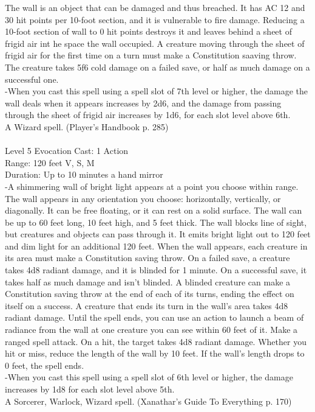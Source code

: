 \documentclass[10pt,twocolumn]{report}
\begin{document}
The wall is an object that can be damaged and thus breached. It has AC 12 and 30 hit points per 10-foot section, and it is vulnerable to fire damage. Reducing a 10-foot section of wall to 0 hit points destroys it and leaves behind a sheet of frigid air int he space the wall occupied. A creature moving through the sheet of frigid air for the first time on a turn must make a Constitution saaving throw. The creature takes 5f6 cold damage on a failed save, or half as much damage on a successful one.\\
-When you cast this spell using a spell slot of 7th level or higher, the damage the wall deals when it appears increases by 2d6, and the damage from passing through the sheet of frigid air increases by 1d6, for each slot level above 6th.\\
A Wizard spell. (Player's Handbook p. 285) \\


 \\
Level 5 \quad Evocation \quad Cast: 1 Action\\
Range: 120 feet \quad V, S, M\\
Duration: Up to 10 minutes \quad a hand mirror\\
-A shimmering wall of bright light appears at a point you choose within range. The wall appears in any orientation you choose: horizontally, vertically, or diagonally. It can be free floating, or it can rest on a solid surface. The wall can be up to 60 feet long, 10 feet high, and 5 feet thick. The wall blocks line of sight, but creatures and objects can pass through it. It emits bright light out to 120 feet and dim light for an additional 120 feet.
When the wall appears, each creature in its area must make a Constitution saving throw. On a failed save, a creature takes 4d8 radiant damage, and it is blinded for 1 minute. On a successful save, it takes half as much damage and isn’t blinded. A blinded creature can make a Constitution saving throw at the end of each of its turns, ending the effect on itself on a success.
A creature that ends its turn in the wall’s area takes 4d8 radiant damage.
Until the spell ends, you can use an action to launch a beam of radiance from the wall at one creature you can see within 60 feet of it. Make a ranged spell attack. On a hit, the target takes 4d8 radiant damage. Whether you hit or miss, reduce the length of the wall by 10 feet. If the wall’s length drops to 0 feet, the spell ends.\\
-When you cast this spell using a spell slot of 6th level or higher, the damage increases by 1d8 for each slot level above 5th.\\
A Sorcerer, Warlock, Wizard spell. (Xanathar's Guide To Everything p. 170) \\
\end{document}
